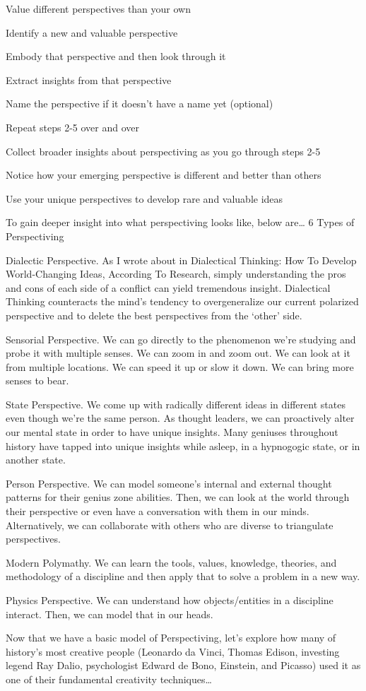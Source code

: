     Value different perspectives than your own

    Identify a new and valuable perspective

    Embody that perspective and then look through it

    Extract insights from that perspective

    Name the perspective if it doesn’t have a name yet (optional)

    Repeat steps 2-5 over and over

    Collect broader insights about perspectiving as you go through steps 2-5

    Notice how your emerging perspective is different and better than others

    Use your unique perspectives to develop rare and valuable ideas

To gain deeper insight into what perspectiving looks like, below are…
6 Types of Perspectiving

    Dialectic Perspective. As I wrote about in Dialectical Thinking: How To Develop World-Changing Ideas, According To Research, simply understanding the pros and cons of each side of a conflict can yield tremendous insight. Dialectical Thinking counteracts the mind’s tendency to overgeneralize our current polarized perspective and to delete the best perspectives from the ‘other’ side.

    Sensorial Perspective. We can go directly to the phenomenon we’re studying and probe it with multiple senses. We can zoom in and zoom out. We can look at it from multiple locations. We can speed it up or slow it down. We can bring more senses to bear.

    State Perspective. We come up with radically different ideas in different states even though we’re the same person. As thought leaders, we can proactively alter our mental state in order to have unique insights. Many geniuses throughout history have tapped into unique insights while asleep, in a hypnogogic state, or in another state.

    Person Perspective. We can model someone’s internal and external thought patterns for their genius zone abilities. Then, we can look at the world through their perspective or even have a conversation with them in our minds. Alternatively, we can collaborate with others who are diverse to triangulate perspectives.

    Modern Polymathy. We can learn the tools, values, knowledge, theories, and methodology of a discipline and then apply that to solve a problem in a new way.

    Physics Perspective. We can understand how objects/entities in a discipline interact. Then, we can model that in our heads.

Now that we have a basic model of Perspectiving, let’s explore how many of history’s most creative people (Leonardo da Vinci, Thomas Edison, investing legend Ray Dalio, psychologist Edward de Bono, Einstein, and Picasso) used it as one of their fundamental creativity techniques…
